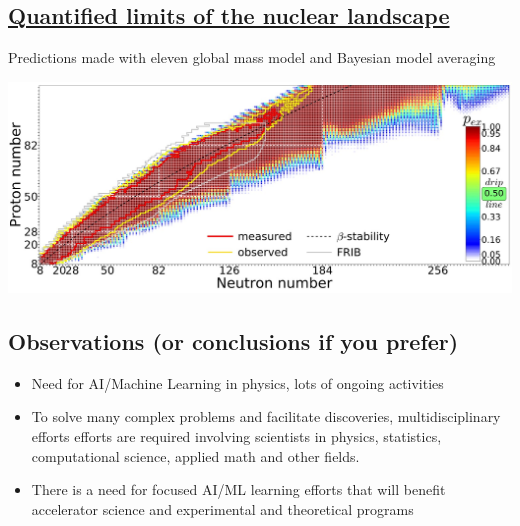 \documentclass[%
oneside,                 %
final,                   %
10pt]{article}
\begin{document}
\subsection{\href{{https://journals.aps.org/prc/abstract/10.1103/PhysRevC.101.044307}}{Quantified limits of the nuclear landscape}}

Predictions made with eleven global mass model and Bayesian model averaging

\vspace{6mm}

\centerline{\includegraphics[width=1.0\linewidth]{figures/landscape.jpg}}

\vspace{6mm}

\subsection{Observations (or conclusions if you prefer)}
\begin{block}{}
\begin{itemize}
\item Need for AI/Machine Learning in physics, lots of ongoing activities

\item To solve many complex problems and facilitate discoveries, multidisciplinary efforts efforts are required involving scientists in  physics, statistics, computational science, applied math and other fields.

\item There is a need for  focused AI/ML learning efforts that will benefit accelerator science and experimental and theoretical programs
\end{itemize}

\noindent
\end{block}

\end{document}
